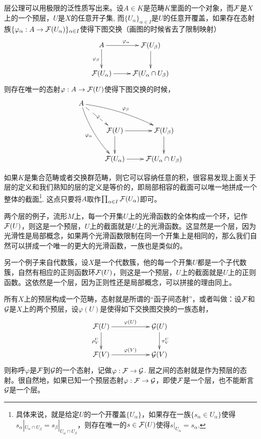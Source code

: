 层公理可以用极限的泛性质写出来。设$A\in K$是范畴$K$里面的一个对象，而$\mathcal{F}$是$X$上的一个预层，$U$是$X$的任意开子集, 而$\{U_\alpha\}_{\alpha\in I}$是$U$的任意开覆盖，如果存在态射族$\{\varphi_\alpha:A\to \mathcal{F}(U_\alpha)\}_{\alpha\in I}$使得下图交换（画图的时候省去了限制映射）
\[
	\xymatrix{
		A\ar[r]^{\varphi_{\alpha}}\ar[d]_{\varphi_{\beta}}&\calf(U_\beta)\ar[d]\\
		\calf(U_\alpha)\ar[r]&\calf(U_{\alpha}\cap U_{\beta})
	}
\]
则存在唯一的态射$\varphi:A\to \mathcal{F}(U)$使得下图交换的时候，
\[
	\xymatrix{
		A\ar@/_/[ddr]_{\varphi_{\alpha}}\ar@/^/[drr]^{\varphi_{\beta}}\ar@{-->}[dr]|{\varphi}&& \\
		&\calf(U)\ar[r]\ar[d]&\calf(U_\beta)\ar[d]\\
		&\calf(U_\alpha)\ar[r]&\calf(U_{\alpha}\cap U_{\beta})
	}
\]

如果$K$是集合范畴或者交换群范畴，则它可以容纳任意的积，很容易发现上面关于层的定义和我们熟知的层的定义是等价的，即局部相容的截面可以唯一地拼成一个整体的截面\footnote{具体来说，就是给定$U$的一个开覆盖$\{U_\alpha\}$，如果存在一族$\{s_\alpha\in U_\alpha\}$使得$s_\alpha|_{U_\alpha\cap U_\beta}=s_\beta|_{U_\alpha\cap U_\beta}$，则存在唯一的$s\in \mathcal{F}(U)$使得$s|_{U_\alpha}=s_\alpha$.}. 这点只要将$A$取作$\prod_{\alpha\in I}\mathcal{F}(U_\alpha)$即可。

\begin{para}
两个层的例子，流形$M$上，每一个开集$U$上的光滑函数的全体构成一个环，记作$\mathcal{F}(U)$，则这是一个预层，$U$上的截面就是$U$上的光滑函数。这显然是一个层，因为光滑性是局部概念，如果两个光滑函数限制在同一个开集上是相同的，那么我们自然可以拼成一个唯一的更大的光滑函数，一族也是类似的。

另一个例子来自代数簇，设$X$是一个代数簇，他的每一个开集$U$都是一个子代数簇，自然有相应的正则函数环$\mathcal{F}(U)$，则这是一个预层，$U$上的截面就是$U$上的正则函数。这依然是一个层，因为正则性还是局部概念，可以拼接的理由同上。
\end{para}

\begin{para}
所有$X$上的预层构成一个范畴，态射就是所谓的“函子间态射”，或者叫做：设$\mathcal{F}$和$\mathcal{G}$是$X$上的两个预层，设$\varphi(U)$是使得如下交换图交换的一族态射，
\[
	\xymatrix{
		\calf(U)\ar[rr]^{\varphi(U)} \ar[d]_{\rho^U_V}&&\calg(U) \ar[d]^{\pi^U_V}\\
		\calf(V)\ar[rr]^{\varphi(V)}&&\calg(V)
	}
\]
则称呼$\varphi$是$\mathcal{F}$到$\mathcal{G}$的一个态射，记做$\varphi:\mathcal{F}\to\mathcal{G}$. 层之间的态射就是作为预层的态射。很自然地，如果已知一个预层态射$\varphi:\mathcal{F}\to\mathcal{G}$，即使$\mathcal{F}$是一个层，也不能断言$\mathcal{G}$是一个层。
\end{para}

